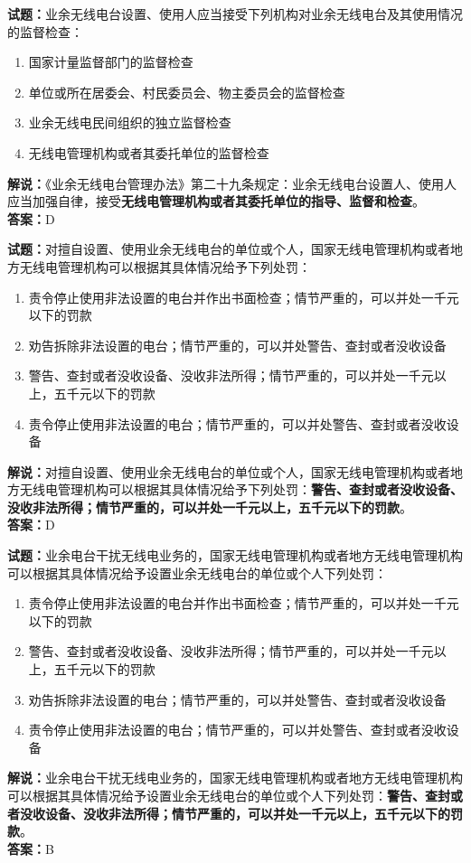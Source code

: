 \documentclass{ctexbook}
\begin{document}
\bigskip


\noindent\textbf{试题：}业余无线电台设置、使用人应当接受下列机构对业余无线电台及其使用情况的监督检查：
\begin{enumerate}[leftmargin=3em]
\item 国家计量监督部门的监督检查
\item 单位或所在居委会、村民委员会、物主委员会的监督检查
\item 业余无线电民间组织的独立监督检查
\item 无线电管理机构或者其委托单位的监督检查
\end{enumerate}
\noindent\textbf{解说：}《业余无线电台管理办法》第二十九条规定：业余无线电台设置人、使用人应当加强自律，接受\textbf{无线电管理机构或者其委托单位的指导、监督和检查}。\\\noindent\textbf{答案：}D



\bigskip


\noindent\textbf{试题：}对擅自设置、使用业余无线电台的单位或个人，国家无线电管理机构或者地方无线电管理机构可以根据其具体情况给予下列处罚：
\begin{enumerate}[leftmargin=3em]
\item 责令停止使用非法设置的电台并作出书面检查；情节严重的，可以并处一千元以下的罚款
\item 劝告拆除非法设置的电台；情节严重的，可以并处警告、查封或者没收设备
\item 警告、查封或者没收设备、没收非法所得；情节严重的，可以并处一千元以上，五千元以下的罚款
\item 责令停止使用非法设置的电台；情节严重的，可以并处警告、查封或者没收设备
\end{enumerate}
\noindent\textbf{解说：}对擅自设置、使用业余无线电台的单位或个人，国家无线电管理机构或者地方无线电管理机构可以根据其具体情况给予下列处罚：\textbf{警告、查封或者没收设备、没收非法所得；情节严重的，可以并处一千元以上，五千元以下的罚款}。\\\textbf{答案：}D


\bigskip


\noindent\textbf{试题：}业余电台干扰无线电业务的，国家无线电管理机构或者地方无线电管理机构可以根据其具体情况给予设置业余无线电台的单位或个人下列处罚：
\begin{enumerate}[leftmargin=3em]
\item 责令停止使用非法设置的电台并作出书面检查；情节严重的，可以并处一千元以下的罚款
\item 警告、查封或者没收设备、没收非法所得；情节严重的，可以并处一千元以上，五千元以下的罚款
\item 劝告拆除非法设置的电台；情节严重的，可以并处警告、查封或者没收设备
\item 责令停止使用非法设置的电台；情节严重的，可以并处警告、查封或者没收设备
\end{enumerate}
\noindent\textbf{解说：}业余电台干扰无线电业务的，国家无线电管理机构或者地方无线电管理机构可以根据其具体情况给予设置业余无线电台的单位或个人下列处罚：\textbf{警告、查封或者没收设备、没收非法所得；情节严重的，可以并处一千元以上，五千元以下的罚款}。\\\noindent\textbf{答案：}B
\end{document}
